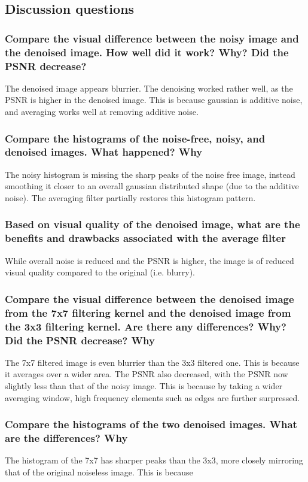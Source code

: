 \documentclass[article, 1.5space, letterpaper, 12pt, oneside, header, footer]{SydeClass}
\begin{document}
\clearpage


\subsection{Discussion questions}

\subsubsection{Compare the visual difference between the noisy image and the denoised image. How well did it
work? Why? Did the PSNR decrease?}
The denoised image appears blurrier. The denoising worked rather well, as the PSNR is higher in the denoised image. This is because gaussian is additive noise, and averaging works well at removing additive noise.

\subsubsection{Compare the histograms of the noise-free, noisy, and denoised images. What happened? Why}
The noisy histogram is missing the sharp peaks of the noise free image, instead smoothing it closer to an overall gaussian distributed shape (due to the additive noise). The averaging filter partially restores this histogram pattern.


\subsubsection{Based on visual quality of the denoised image, what are the benefits and drawbacks associated with
the average filter}
While overall noise is reduced and the PSNR is higher, the image is of reduced visual quality compared to the original (i.e. blurry).


\subsubsection{Compare the visual difference between the denoised image from the 7x7 filtering kernel and the
denoised image from the 3x3 filtering kernel. Are there any differences? Why? Did the PSNR
decrease? Why}
The 7x7 filtered image is even blurrier than the 3x3 filtered one. This is because it averages over a wider area. The PSNR also decreased, with the PSNR now slightly less than that of the noisy image. This is because by taking a wider averaging window, high frequency elements such as edges are further surpressed.


\subsubsection{Compare the histograms of the two denoised images. What are the differences? Why}
The histogram of the 7x7 has sharper peaks than the 3x3, more closely mirroring that of the original noiseless image. This is because
\end{document}
